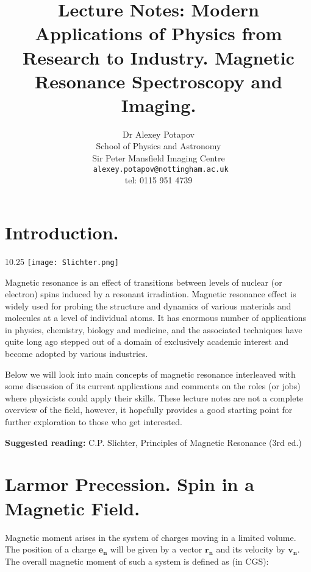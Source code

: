 \documentclass[a4paper, 12pt]{article}
\begin{document}
\title{ Lecture Notes: Modern Applications of Physics from Research to Industry. Magnetic Resonance Spectroscopy and Imaging.}
\author{Dr Alexey Potapov\\
School of Physics and Astronomy\\
Sir Peter Mansfield Imaging Centre \\
\texttt{ alexey.potapov@nottingham.ac.uk}\\
tel: 0115 951 4739 }
\maketitle
 
\section{Introduction.}

\begin{wrapfigure}{1}{0.25\textwidth}
\texttt{[image: Slichter.png]}
\end{wrapfigure}

Magnetic resonance is an effect of transitions between levels of nuclear (or electron) spins induced by a resonant irradiation. Magnetic resonance effect is  widely used for probing the structure and dynamics of various materials and molecules at a level of individual atoms. It has enormous number of applications in physics, chemistry, biology and medicine, and the associated techniques have quite long ago stepped out of a domain of exclusively academic interest and become adopted by various industries.

Below we will look into main concepts of magnetic resonance interleaved with some discussion of its current applications and comments on the roles (or jobs) where physicists could apply their skills. These lecture notes are not a complete overview of the field, however, it hopefully provides a good starting point for further exploration to those who get interested.

\textbf{Suggested reading:} C.P. Slichter, Principles of Magnetic Resonance (3rd ed.)

\section{Larmor Precession. Spin in a Magnetic Field.}
Magnetic moment arises in the system of charges moving in a limited volume. The position of a charge $\bm{e_n}$ will be given by a vector $\bm{r_n}$ and its velocity by $\bm{v_n}$. The overall magnetic moment of such a system is defined as (in CGS):
\end{document}
